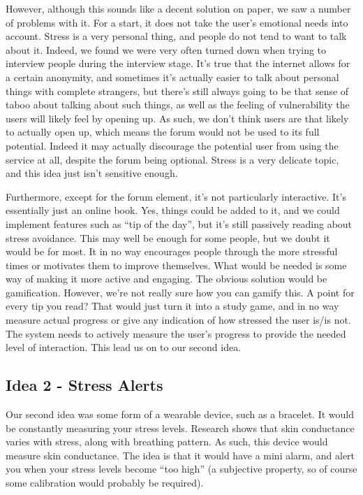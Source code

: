 \documentclass{scrartcl}
\begin{document}
However, although this sounds like a decent solution on paper, we saw a number of problems with it.
For a start, it does not take the user's emotional needs into account. Stress is a very personal thing, and people do not
tend to want to talk about it. Indeed, we found we were very often turned down when trying to interview people during the
interview stage. It's true that the internet allows for a certain anonymity, and sometimes it's actually easier to talk
about personal things with complete strangers, but there's still always going to be that sense of taboo about talking about
such things, as well as the feeling of vulnerability the users will likely feel by opening up. As such, we don't think users
are that likely to actually open up, which means the forum would not be used to its full potential. Indeed it may actually
discourage the potential user from using the service at all, despite the forum being optional. Stress is a very delicate
topic, and this idea just isn't sensitive enough.

Furthermore, except for the
forum element, it's not particularly interactive. It's essentially just an online book. Yes, things could be added to it, and we
could implement features such as ``tip of the day'', but it's still passively reading about stress avoidance. This may well be
enough for some people, but we doubt it would be for most. It in no way encourages people through the more stressful times or
motivates them to improve themselves. What would be needed is some way of making it more active and engaging. The obvious
solution would be gamification. However, we're not really sure how you can gamify this. A point for every tip you read?
That would just turn it into a study game, and in no way measure actual progress or give any indication of how stressed the user
is/is not. The system needs to actively measure the user's progress to provide the needed level of interaction. This lead
us on to our second idea.

\subsection{Idea 2 - Stress Alerts}
Our second idea was some form of a wearable device, such as a bracelet. It would be constantly measuring your stress levels.
Research shows that skin conductance varies with stress, along with breathing pattern. As such, this device would measure
skin conductance. The idea is that it would have a mini alarm, and alert you when your stress levels become ``too high''
(a subjective property, so of course some calibration would probably be required).
\end{document}
